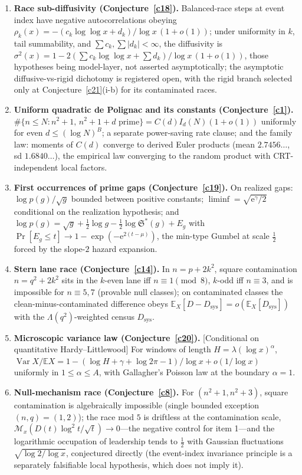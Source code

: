 \documentclass[11pt]{article}
\theoremstyle{definition}
\newcommand{\e}{\mathrm{e}}
\newcommand{\SG}{\mathfrak S}
\newcommand{\M}{\mathcal M}
\begin{document}
\begin{enumerate}
\item \textbf{Race sub-diffusivity (Conjecture~\ref{c18}).}
Balanced-race steps at event index have negative autocorrelations
obeying $\rho_k(x)=-(c_k\log\log x+d_k)/\log x\,(1+o(1))$; under
uniformity in $k$, tail summability, and $\sum c_k,\sum|d_k|<\infty$,
the diffusivity is
$\sigma^2(x)=1-2(\sum c_k\log\log x+\sum d_k)/\log x\,(1+o(1))$,
those hypotheses being model-layer, not asserted asymptotically;
the asymptotic diffusive-vs-rigid dichotomy is registered open,
with the rigid branch selected only at Conjecture~\ref{c21}(i-b)
for its contaminated races.

\item \textbf{Uniform quadratic de Polignac and its constants
(Conjecture~\ref{c1}).}  $\#\{n\le N:n^2+1,\,n^2+1+d
\text{ prime}\}=C(d)I_d(N)(1+o(1))$ uniformly for even
$d\le(\log N)^B$; a separate power-saving rate clause; and the
family law: moments of $C(d)$ converge to derived Euler products
(mean $2.7456\ldots$, sd $1.6840\ldots$), the empirical law
converging to the random product with CRT-independent local factors.

\item \textbf{First occurrences of prime gaps
(Conjecture~\ref{c19}).}  On realized gaps: $\log p(g)/\sqrt g$
bounded between positive constants;
$\liminf=\sqrt{\e^{\gamma}/2}$ conditional on the realization
hypothesis; and
$\log p(g)=\sqrt g+\tfrac12\log g-\tfrac12\log\SG^*(g)+E_g$ with
$\Pr[E_g\le t]\to1-\exp(-\e^{2(t-\mu)})$, the min-type Gumbel at
scale $\tfrac12$ forced by the slope-$2$ hazard expansion.

\item \textbf{Stern lane race (Conjecture~\ref{c14}).}  In
$n=p+2k^2$, square contamination $n=q^2+2k^2$ sits in the $k$-even
lane iff $n\equiv1\pmod8$, $k$-odd iff $n\equiv3$, and is
impossible for $n\equiv5,7$ (provable null classes); on contaminated
classes the clean-minus-contaminated difference obeys
$\mathbb E_X[D-D_{\mathrm{sys}}]=o(\mathbb E_X[D_{\mathrm{sys}}])$
with the $\Lambda(q^2)$-weighted census $D_{\mathrm{sys}}$.

\item \textbf{Microscopic variance law (Conjecture~\ref{c20}).}
[Conditional on quantitative Hardy--Littlewood]  For windows of
length $H=\lambda(\log x)^{\alpha}$,
$\operatorname{Var}X/\mathbb EX=1-(\log H+\gamma+\log2\pi-1)/\log x
+o(1/\log x)$ uniformly in $1\le\alpha\le A$, with Gallagher's
Poisson law at the boundary $\alpha=1$.

\item \textbf{Null-mechanism race (Conjecture~\ref{c8}).}  For
$(n^2+1,n^2+3)$, square contamination is algebraically impossible (single bounded exception $(n,q)=(1,2)$);
the race mod $5$ is driftless at the contamination scale,
$\M_x(D(t)\log^2t/\sqrt t)\to0$---the negative control for
item 1---and the logarithmic occupation of leadership tends to
$\tfrac12$ with Gaussian fluctuations $\sqrt{\log2/\log x}$,
conjectured directly (the event-index invariance principle is a
separately falsifiable local hypothesis, which does not imply it).


\end{enumerate}
\end{document}
